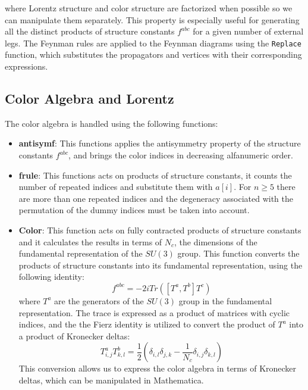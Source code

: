\documentclass[main.tex]{subfiles}
\begin{document}
where Lorentz structure and color structure are factorized when possible so we can manipulate them separately.
This property is especially useful for generating all the distinct products of structure constants \( f^{abc} \) for a given number of external legs. 
The Feynman rules are applied to the Feynman diagrams using the \texttt{Replace} function, which substitutes the propagators and vertices with their corresponding expressions.

\subsection{Color Algebra and Lorentz}

The color algebra is handled using the following functions:

\begin{itemize}
    \item \textbf{antisymf}: This functions applies the antisymmetry property of the structure constants $f^{abc}$, 
    and brings the color indices in decreasing alfanumeric order.
    \item \textbf{frule}: This functions acts on products of structure constants, it counts the number of repeated indices and 
    substitute them with $a[i]$. For $n \ge 5$ there are more than one repeated indices and the degeneracy associated with the permutation
    of the dummy indices must be taken into account.
    \item \textbf{Color}: This function acts on fully contracted products of structure constants and it calculates the results in terms
    of $N_c$, the dimensions of the fundamental representation of the $SU(3)$ group. This function converts the products
    of structure constants into its fundamental representation, using the following identity:
    \begin{equation}
        f^{abc} = -2 i Tr \left( [T^a ,T^b] T^c \right)
    \end{equation}
    where $T^a$ are the generators of the $SU(3)$ group in the fundamental representation.
    The trace is expressed as a product of matrices with cyclic indices, and the the Fierz identity is utilized to convert the product of 
    $T^a$ into a product of Kronecker deltas:
    \begin{equation}
        T^a_{i,j} T^b_{k,l} = \frac{1}{2} \left( \delta_{i, l} \delta_{j, k} - \frac{1}{N_c} \delta_{i, j} \delta_{k, l} \right)
    \end{equation} 
    This conversion allows us to express the color algebra in terms of Kronecker deltas, which can be manipulated in Mathematica.
    

\end{itemize}
\end{document}
